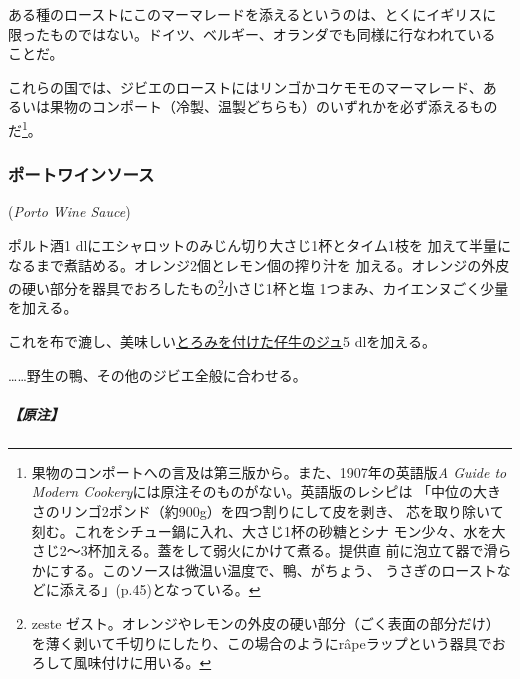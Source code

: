 \begin{recette}
ある種のローストにこのマーマレードを添えるというのは、とくにイギリスに
限ったものではない。ドイツ、ベルギー、オランダでも同様に行なわれている
ことだ。

これらの国では、ジビエのローストにはリンゴかコケモモのマーマレード、あ
るいは果物のコンポート（冷製、温製どちらも）のいずれかを必ず添えるもの
だ\footnote{果物のコンポートへの言及は第三版から。また、1907年の英語版\emph{A
  Guide to Modern Cookery}には原注そのものがない。英語版のレシピは
  「中位の大きさのリンゴ2ポンド（約900g）を四つ割りにして皮を剥き、
  芯を取り除いて刻む。これをシチュー鍋に入れ、大さじ1杯の砂糖とシナ
  モン少々、水を大さじ2〜3杯加える。蓋をして弱火にかけて煮る。提供直
  前に泡立て器で滑らかにする。このソースは微温い温度で、鴨、がちょう、
  うさぎのローストなどに添える」(p.45)となっている。}。

\maeaki

\hypertarget{porto-wine-sauce}{%
\subsubsection{ポートワインソース}\label{porto-wine-sauce}}

 (\emph{Porto Wine Sauce})


ポルト酒1\undemi{} dlにエシャロットのみじん切り大さじ1杯とタイム1枝を
加えて半量になるまで煮詰める。オレンジ2個とレモン\undemi{}個の搾り汁を
加える。オレンジの外皮の硬い部分を器具でおろしたもの\footnote{zeste
  ゼスト。オレンジやレモンの外皮の硬い部分（ごく表面の部分だけ）を薄く剥いて千切りにしたり、この場合のようにrâpeラップという器具でおろして風味付けに用いる。}小さじ1杯と塩
1つまみ、カイエンヌごく少量を加える。

これを布で漉し、美味しい\protect\hyperlink{jus-de-veau-lie}{とろみを付けた仔牛のジュ}5
dlを加える。

\ldots{}\ldots{}野生の鴨、その他のジビエ全般に合わせる。

\hypertarget{nota-porto-wine-sauce}{%
\subparagraph{【原注】}\label{nota-porto-wine-sauce}}


\end{recette}
